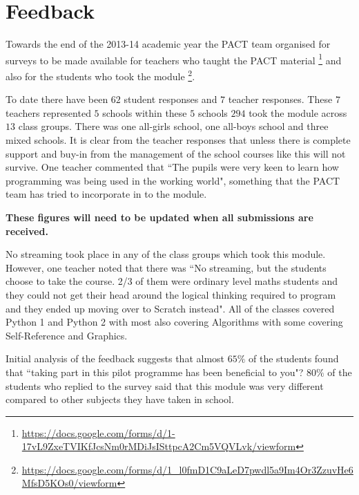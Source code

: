 \documentclass[a4paper]{article}
\begin{document}

\section{Feedback} \label{label:Feedback}
Towards the end of the 2013-14 academic year the PACT team organised for surveys to be made available for teachers who taught the PACT material \footnote{\url{https://docs.google.com/forms/d/1-17vL9ZxeTVIKfJcsNm0rMDiJsISttpcA2Cm5VQVLvk/viewform}} and also for the students who took the module \footnote{\url{https://docs.google.com/forms/d/1_l0fmD1C9aLeD7pwdl5a9Im4Or3ZzuvHe6MfsD5KOs0/viewform}}. 

To date there have been $62$ student responses and $7$ teacher responses.  These $7$ teachers represented $5$ schools within these $5$ schools $294$ took the module across $13$ class groups. There was one all-girls school, one all-boys school and three mixed schools. It is clear from the teacher responses that unless there is complete support and buy-in from the management of the school courses like this will not survive.  One teacher commented that ``The pupils were very keen to learn how programming was being used in the working world", something that the PACT team has tried to incorporate in to the module.

\textbf{These figures will need to be updated when all submissions are received.}

No streaming took place in any of the class groups which took this module. However, one teacher noted that there was ``No streaming, but the students choose to take the course. 2/3 of them were ordinary level maths students and they could not get their head around the logical thinking required to program and they ended up moving over to Scratch instead". All of the classes covered Python 1 and Python 2 with most also covering Algorithms with some covering Self-Reference and Graphics.

Initial analysis of the feedback suggests that almost $65\%$ of the students found that ``taking part in this pilot programme has been beneficial to you"? $80\%$ of the students who replied to the survey said that this module was very different compared to other subjects they have taken in school.
\end{document}

